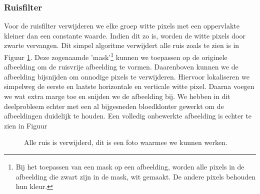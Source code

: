 \documentclass[a4paper,kulak]{kulakarticle}
\begin{document}
	\subsubsection{Ruisfilter}
		Voor de ruisfilter verwijderen we elke groep witte pixels met een oppervlakte kleiner dan een constante waarde. Indien dit zo is, worden de witte pixels door zwarte vervangen. Dit simpel algoritme verwijdert alle ruis zoals te zien is in Figuur \ref{figuur ruisfilter}. Deze zogenaamde 'mask'\footnote{Bij het toepassen van een mask op een afbeelding, worden alle pixels in de afbeelding die zwart zijn in de mask, wit gemaakt. De andere pixels behouden hun kleur.} kunnen we toepassen op de originele afbeelding om de ruisvrije afbeelding te vormen. Daarenboven kunnen we de afbeelding bijsnijden om onnodige pixels te verwijderen. Hiervoor lokaliseren we simpelweg de eerste en laatste horizontale en verticale witte pixel. Daarna voegen we wat extra marge toe en snijden we de afbeelding bij. We hebben in dit deelprobleem echter met een al bijgesneden bloedklonter gewerkt om de afbeeldingen duidelijk te houden. Een volledig onbewerkte afbeelding is echter te zien in Figuur 

	\begin{figure}[H]
		\centering
		\qquad
		
		\caption{Alle ruis is verwijderd, dit is een foto waarmee we kunnen werken.}
		\label{figuur ruisfilter}
	\end{figure}
\end{document}
